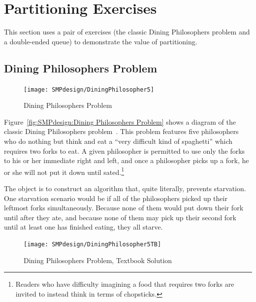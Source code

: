 
\section{Partitioning Exercises}
\label{sec:SMPdesign:Partitioning Exercises}

This section uses a pair of exercises (the classic Dining Philosophers
problem and a double-ended queue) to demonstrate the value of partitioning.

\subsection{Dining Philosophers Problem}
\label{sec:SMPdesign:Dining Philosophers Problem}

\begin{figure}[tb]
\begin{center}
\texttt{[image: SMPdesign/DiningPhilosopher5]}
\end{center}
\caption{Dining Philosophers Problem}
\end{figure}

Figure~\ref{fig:SMPdesign:Dining Philosophers Problem} shows a diagram
of the classic Dining Philosophers problem~\cite{Dijkstra1971HOoSP}.
This problem features five philosophers who do nothing but think and
eat a ``very difficult kind of spaghetti'' which requires two forks
to eat.
A given philosopher is permitted to use only the forks to his or her
immediate right and left, and once a philosopher picks up a fork,
he or she will not put it down until sated.\footnote{
	Readers who have difficulty imagining a food that requires
	two forks are invited to instead think in terms of chopsticks.}

The object is to construct an algorithm that, quite literally,
prevents starvation.
One starvation scenario would be if all of the philosophers picked up
their leftmost forks simultaneously.
Because none of them would put down their fork until after they ate,
and because none of them may pick up their second fork until at least
one has finished eating, they all starve.

\begin{figure}[tb]
\begin{center}
\texttt{[image: SMPdesign/DiningPhilosopher5TB]}
\end{center}
\caption{Dining Philosophers Problem, Textbook Solution}
\end{figure}

